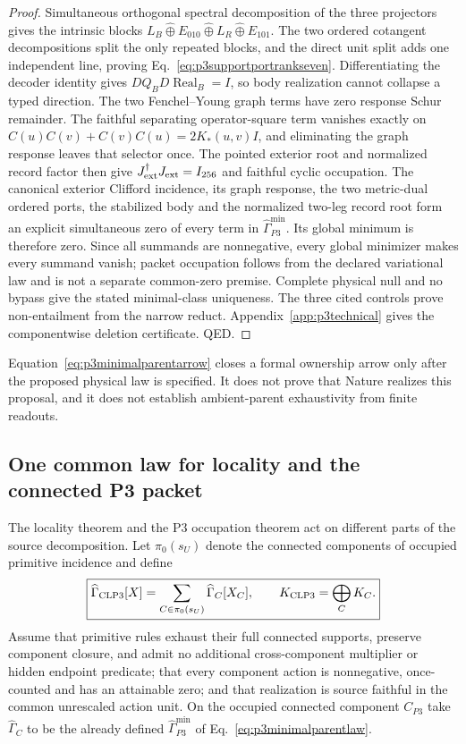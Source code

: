 \begin{proof}
Simultaneous orthogonal spectral decomposition of the three projectors gives
the intrinsic blocks $L_B\widehat\oplus E_{010}
\widehat\oplus L_R\widehat\oplus E_{101}$.  The two ordered cotangent
decompositions split the only repeated blocks, and the direct unit split adds
one independent line, proving Eq.~\eqref{eq:p3supportportrankseven}.
Differentiating the decoder identity gives
$DQ_BD\operatorname{Real}_B=I$, so body realization cannot collapse a typed
direction.  The two Fenchel--Young graph terms have zero response Schur
remainder.  The faithful separating operator-square term vanishes exactly on
$C(u)C(v)+C(v)C(u)=2K_*(u,v)I$, and eliminating the graph response leaves
that selector once.  The pointed exterior root and normalized record factor
then give $J_{\rm ext}^\dagger J_{\rm ext}=I_{256}$ and faithful cyclic
occupation.  The canonical exterior Clifford incidence, its graph response,
the two metric-dual ordered ports, the stabilized body and the normalized
two-leg record root form an explicit simultaneous zero of every term in
$\widehat\Gamma_{P3}^{\min}$.  Its global minimum is therefore zero.  Since
all summands are nonnegative, every global minimizer makes every summand
vanish; packet occupation follows from the declared variational law and is
not a separate common-zero premise.  Complete physical null and no bypass
give the stated
minimal-class uniqueness.  The three cited controls prove non-entailment from
the narrow reduct.  Appendix~\ref{app:p3technical} gives the componentwise
deletion certificate.  QED.
\end{proof}

Equation~\eqref{eq:p3minimalparentarrow} closes a formal ownership arrow only
after the proposed physical law is specified.  It does not prove that Nature
realizes this proposal, and it does not establish ambient-parent
exhaustivity from finite readouts.

\subsection{One common law for locality and the connected P3 packet}
\label{sec:jointlocalp3}

The locality theorem and the P3 occupation theorem act on different parts of
the source decomposition.  Let $\pi_0(s_U)$ denote the connected components
of occupied primitive incidence and define
\begin{equation}
 \boxed{
 \widehat\Gamma_{\rm CLP3}[X]
 =\sum_{C\in\pi_0(s_U)}\widehat\Gamma_C[X_C],
 \qquad K_{\rm CLP3}=\bigoplus_C K_C.}
 \label{eq:jointlocalp3action}
\end{equation}
Assume that primitive rules exhaust their full connected supports, preserve
component closure, and admit no additional cross-component multiplier or
hidden endpoint predicate; that every component action is nonnegative,
once-counted and has an attainable zero; and that realization is source
faithful in the common unrescaled action unit.  On the occupied connected
component $C_{P3}$ take $\widehat\Gamma_C$ to be the already defined
$\widehat\Gamma_{P3}^{\min}$ of
Eq.~\eqref{eq:p3minimalparentlaw}.


